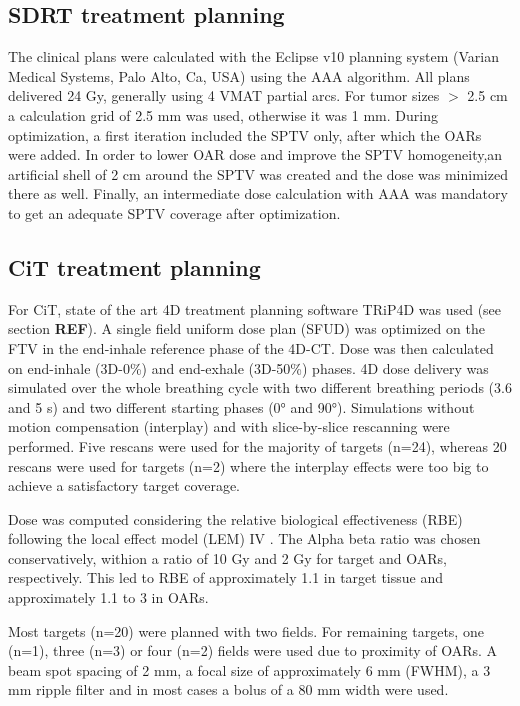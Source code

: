 \documentclass[type=dr, dr=rernat, accentcolor=tud7b,colorbacktitle, bigchapter, openright, twoside, 12pt ]{tudthesis}
\begin{document}
\subsection{SDRT treatment planning}

The clinical plans were calculated with the Eclipse v10 planning system (Varian Medical Systems, Palo Alto, Ca, USA) using the AAA algorithm. All plans delivered 24 Gy, 
generally using 4 VMAT partial arcs. For tumor sizes $>$ 2.5 cm a calculation grid of 2.5 mm was used, otherwise it was 1 mm. During optimization, a first iteration included the 
SPTV only, after which the OARs were added. In order to lower OAR dose and improve the SPTV homogeneity,an artificial shell of 2 cm around the SPTV was created and the dose was minimized there as well.
Finally, an intermediate dose calculation with AAA was mandatory to get an adequate SPTV coverage after optimization.

\subsection{CiT treatment planning}

For CiT, state of the art 4D treatment planning software TRiP4D was used (see section \textbf{REF}). A single field uniform dose plan (SFUD) was optimized on the FTV in the end-inhale reference phase of the 4D-CT. 
Dose was then calculated on end-inhale (3D-0\%) and end-exhale (3D-50\%) phases. 4D dose delivery was simulated over the whole breathing cycle with two different breathing periods (3.6 and 5 s) and two different 
starting phases (0° and 90°). Simulations without motion compensation (interplay) and with slice-by-slice rescanning were performed. Five rescans were used for the majority of targets (n=24), whereas 20 rescans 
were used for targets (n=2) where the interplay effects were too big to achieve a satisfactory target coverage. 

Dose was computed considering the relative biological effectiveness (RBE) following the local effect model (LEM) IV \cite{Elsaesser2010}. The Alpha beta ratio was chosen conservatively, withion a ratio of 10 Gy
and 2 Gy for target and OARs, respectively. This led to RBE of approximately 1.1 in target tissue and approximately 1.1 to 3 in OARs.

Most targets (n=20) were planned with two fields. For remaining targets, one (n=1), three (n=3) or four (n=2) fields were used due to proximity of OARs.
A beam spot spacing of 2 mm, a focal size of approximately 6 mm (FWHM), a 3 mm ripple filter and in most cases a bolus of a 80 mm width were used.
\end{document}
